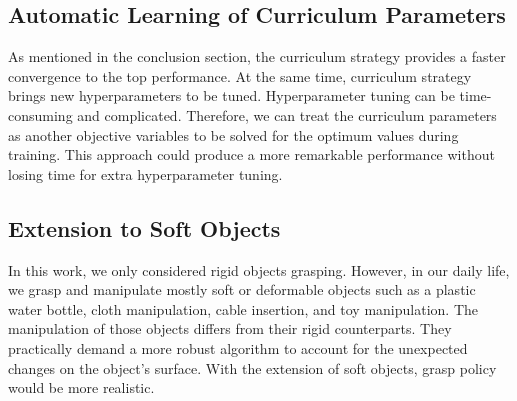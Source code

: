 \subsection{Automatic Learning of Curriculum Parameters}
 
As mentioned in the conclusion section, the curriculum strategy provides a faster convergence to the top performance. At the same time, curriculum strategy brings new hyperparameters to be tuned. Hyperparameter tuning can be time-consuming and complicated. Therefore, we can treat the curriculum parameters as another objective variables to be solved for the optimum values during training. This approach could produce a more remarkable performance without losing time for extra hyperparameter tuning.
 
\subsection{Extension to Soft Objects}
 
In this work, we only considered rigid objects grasping. However, in our daily life, we grasp and manipulate mostly soft or deformable objects such as a plastic water bottle, cloth manipulation, cable insertion, and toy manipulation. The manipulation of those objects differs from their rigid counterparts. They practically demand a more robust algorithm to account for the unexpected changes on the object's surface. With the extension of soft objects, grasp policy would be more realistic.